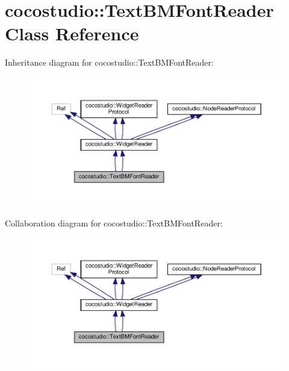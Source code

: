 \hypertarget{classcocostudio_1_1TextBMFontReader}{}\section{cocostudio\+:\+:Text\+B\+M\+Font\+Reader Class Reference}
\label{classcocostudio_1_1TextBMFontReader}


Inheritance diagram for cocostudio\+:\+:Text\+B\+M\+Font\+Reader\+:
\nopagebreak
\begin{figure}[H]
\begin{center}
\leavevmode
\includegraphics[width=350pt]{classcocostudio_1_1TextBMFontReader__inherit__graph}
\end{center}
\end{figure}


Collaboration diagram for cocostudio\+:\+:Text\+B\+M\+Font\+Reader\+:
\nopagebreak
\begin{figure}[H]
\begin{center}
\leavevmode
\includegraphics[width=350pt]{classcocostudio_1_1TextBMFontReader__coll__graph}
\end{center}
\end{figure}
